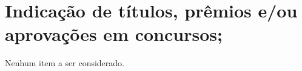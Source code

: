 \section{Indicação de títulos, prêmios e/ou aprovações em concursos;}

Nenhum item a ser considerado.